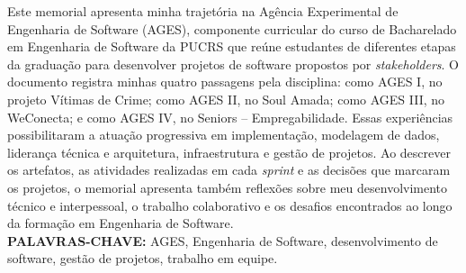\begin{resumo}
  Este memorial apresenta minha trajetória na Agência Experimental de Engenharia
  de Software (AGES), componente curricular do curso de Bacharelado em Engenharia
  de Software da PUCRS que reúne estudantes de diferentes etapas da graduação para
  desenvolver projetos de software propostos por \textit{stakeholders}. O documento
  registra minhas quatro passagens pela disciplina: como AGES I, no projeto Vítimas
  de Crime; como AGES II, no Soul Amada; como AGES III, no WeConecta; e como AGES
  IV, no Seniors -- Empregabilidade. Essas experiências possibilitaram a atuação
  progressiva em implementação, modelagem de dados, liderança técnica e
  arquitetura, infraestrutura e gestão de projetos. Ao descrever os artefatos, as
  atividades realizadas em cada \textit{sprint} e as decisões que marcaram os
  projetos, o memorial apresenta também reflexões sobre meu desenvolvimento
  técnico e interpessoal, o trabalho colaborativo e os desafios encontrados ao
  longo da formação em Engenharia de Software.
  \bigbreak\
  \\\textbf{PALAVRAS-CHAVE:}
  AGES, Engenharia de Software, desenvolvimento de software, gestão de projetos,
  trabalho em equipe.
\end{resumo}
